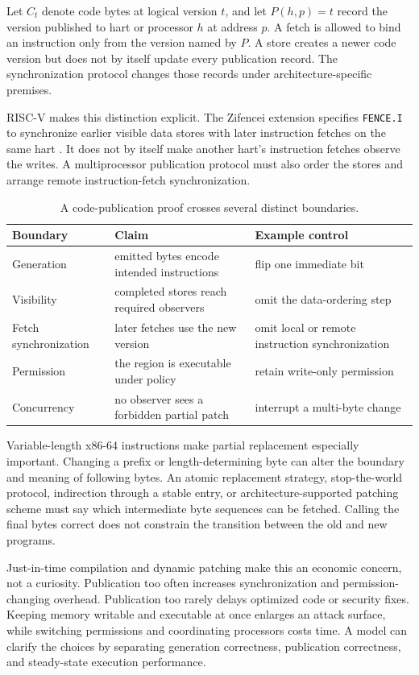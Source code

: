 Let \(C_t\) denote code bytes at logical version \(t\), and let
\(P(h,p)=t\) record the version published to hart or processor \(h\) at address
\(p\). A fetch is allowed to bind an instruction only from the version named by
\(P\). A store creates a newer code version but does not by itself update every
publication record. The synchronization protocol changes those records under
architecture-specific premises.

RISC-V makes this distinction explicit. The Zifencei extension specifies
\texttt{FENCE.I} to synchronize earlier visible data stores with later
instruction fetches on the same hart \autocite{riscv2026zifencei}. It does not
by itself make another hart's instruction fetches observe the writes. A
multiprocessor publication protocol must also order the stores and arrange
remote instruction-fetch synchronization.

\begin{table}[htbp]
\centering
\caption{A code-publication proof crosses several distinct boundaries.}
\begin{tabular}{@{}p{}p{}p{}@{}}
\toprule
Boundary & Claim & Example control \\
\midrule
Generation & emitted bytes encode intended instructions & flip one immediate bit \\
Visibility & completed stores reach required observers & omit the data-ordering step \\
Fetch synchronization & later fetches use the new version & omit local or remote instruction synchronization \\
Permission & the region is executable under policy & retain write-only permission \\
Concurrency & no observer sees a forbidden partial patch & interrupt a multi-byte change \\
\bottomrule
\end{tabular}
\end{table}

Variable-length x86-64 instructions make partial replacement especially
important. Changing a prefix or length-determining byte can alter the boundary
and meaning of following bytes. An atomic replacement strategy, stop-the-world
protocol, indirection through a stable entry, or architecture-supported
patching scheme must say which intermediate byte sequences can be fetched.
Calling the final bytes correct does not constrain the transition between the
old and new programs.

Just-in-time compilation and dynamic patching make this an economic concern,
not a curiosity. Publication too often increases synchronization and
permission-changing overhead. Publication too rarely delays optimized code or
security fixes. Keeping memory writable and executable at once enlarges an
attack surface, while switching permissions and coordinating processors costs
time. A model can clarify the choices by separating generation correctness,
publication correctness, and steady-state execution performance.


